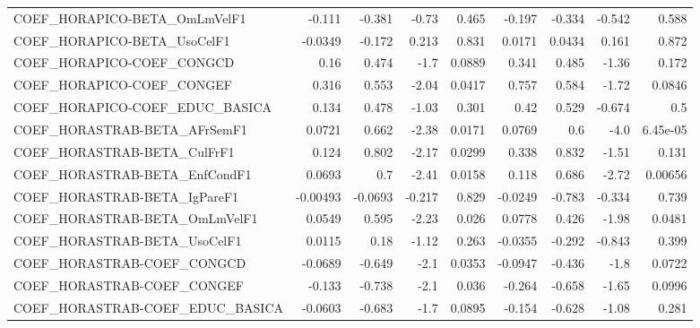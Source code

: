 \begin{tabular}{lrrrrrrrr}
COEF\_HORAPICO-BETA\_OmLmVelF1          &      -0.111 &       -0.381 &    -0.73 &    0.465 &     -0.197 &      -0.334 &       -0.542 &         0.588 \\
COEF\_HORAPICO-BETA\_UsoCelF1           &     -0.0349 &       -0.172 &    0.213 &    0.831 &     0.0171 &      0.0434 &        0.161 &         0.872 \\
COEF\_HORAPICO-COEF\_CONGCD             &        0.16 &        0.474 &     -1.7 &   0.0889 &      0.341 &       0.485 &        -1.36 &         0.172 \\
COEF\_HORAPICO-COEF\_CONGEF             &       0.316 &        0.553 &    -2.04 &   0.0417 &      0.757 &       0.584 &        -1.72 &        0.0846 \\
COEF\_HORAPICO-COEF\_EDUC\_BASICA        &       0.134 &        0.478 &    -1.03 &    0.301 &       0.42 &       0.529 &       -0.674 &           0.5 \\
COEF\_HORASTRAB-BETA\_AFrSemF1          &      0.0721 &        0.662 &    -2.38 &   0.0171 &     0.0769 &         0.6 &         -4.0 &      6.45e-05 \\
COEF\_HORASTRAB-BETA\_CulFrF1           &       0.124 &        0.802 &    -2.17 &   0.0299 &      0.338 &       0.832 &        -1.51 &         0.131 \\
COEF\_HORASTRAB-BETA\_EnfCondF1         &      0.0693 &          0.7 &    -2.41 &   0.0158 &      0.118 &       0.686 &        -2.72 &       0.00656 \\
COEF\_HORASTRAB-BETA\_IgPareF1          &    -0.00493 &      -0.0693 &   -0.217 &    0.829 &    -0.0249 &      -0.783 &       -0.334 &         0.739 \\
COEF\_HORASTRAB-BETA\_OmLmVelF1         &      0.0549 &        0.595 &    -2.23 &    0.026 &     0.0778 &       0.426 &        -1.98 &        0.0481 \\
COEF\_HORASTRAB-BETA\_UsoCelF1          &      0.0115 &         0.18 &    -1.12 &    0.263 &    -0.0355 &      -0.292 &       -0.843 &         0.399 \\
COEF\_HORASTRAB-COEF\_CONGCD            &     -0.0689 &       -0.649 &     -2.1 &   0.0353 &    -0.0947 &      -0.436 &         -1.8 &        0.0722 \\
COEF\_HORASTRAB-COEF\_CONGEF            &      -0.133 &       -0.738 &     -2.1 &    0.036 &     -0.264 &      -0.658 &        -1.65 &        0.0996 \\
COEF\_HORASTRAB-COEF\_EDUC\_BASICA       &     -0.0603 &       -0.683 &     -1.7 &   0.0895 &     -0.154 &      -0.628 &        -1.08 &         0.281 \\

\end{tabular}
